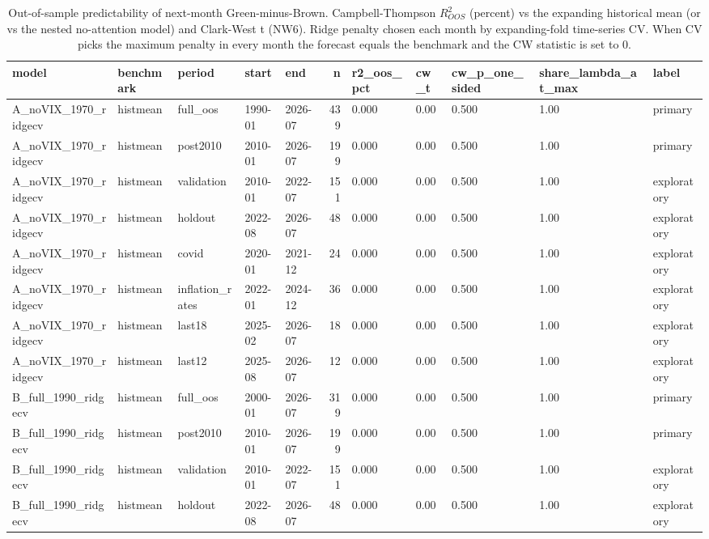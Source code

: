 \begin{table}
\caption{Out-of-sample predictability of next-month Green-minus-Brown. Campbell-Thompson $R^2_{OOS}$ (percent) vs the expanding historical mean (or vs the nested no-attention model) and Clark-West t (NW6). Ridge penalty chosen each month by expanding-fold time-series CV. When CV picks the maximum penalty in every month the forecast equals the benchmark and the CW statistic is set to 0.}
\label{tab:m6_oos_primary}
\begin{tabular}{lllllrlllll}
\toprule
model & benchmark & period & start & end & n & r2\_oos\_pct & cw\_t & cw\_p\_one\_sided & share\_lambda\_at\_max & label \\
\midrule
A\_noVIX\_1970\_ridgecv & histmean & full\_oos & 1990-01 & 2026-07 & 439 & 0.000 & 0.00 & 0.500 & 1.00 & primary \\
A\_noVIX\_1970\_ridgecv & histmean & post2010 & 2010-01 & 2026-07 & 199 & 0.000 & 0.00 & 0.500 & 1.00 & primary \\
A\_noVIX\_1970\_ridgecv & histmean & validation & 2010-01 & 2022-07 & 151 & 0.000 & 0.00 & 0.500 & 1.00 & exploratory \\
A\_noVIX\_1970\_ridgecv & histmean & holdout & 2022-08 & 2026-07 & 48 & 0.000 & 0.00 & 0.500 & 1.00 & exploratory \\
A\_noVIX\_1970\_ridgecv & histmean & covid & 2020-01 & 2021-12 & 24 & 0.000 & 0.00 & 0.500 & 1.00 & exploratory \\
A\_noVIX\_1970\_ridgecv & histmean & inflation\_rates & 2022-01 & 2024-12 & 36 & 0.000 & 0.00 & 0.500 & 1.00 & exploratory \\
A\_noVIX\_1970\_ridgecv & histmean & last18 & 2025-02 & 2026-07 & 18 & 0.000 & 0.00 & 0.500 & 1.00 & exploratory \\
A\_noVIX\_1970\_ridgecv & histmean & last12 & 2025-08 & 2026-07 & 12 & 0.000 & 0.00 & 0.500 & 1.00 & exploratory \\
B\_full\_1990\_ridgecv & histmean & full\_oos & 2000-01 & 2026-07 & 319 & 0.000 & 0.00 & 0.500 & 1.00 & primary \\
B\_full\_1990\_ridgecv & histmean & post2010 & 2010-01 & 2026-07 & 199 & 0.000 & 0.00 & 0.500 & 1.00 & primary \\
B\_full\_1990\_ridgecv & histmean & validation & 2010-01 & 2022-07 & 151 & 0.000 & 0.00 & 0.500 & 1.00 & exploratory \\
B\_full\_1990\_ridgecv & histmean & holdout & 2022-08 & 2026-07 & 48 & 0.000 & 0.00 & 0.500 & 1.00 & exploratory \\

\end{tabular}
\end{table}
